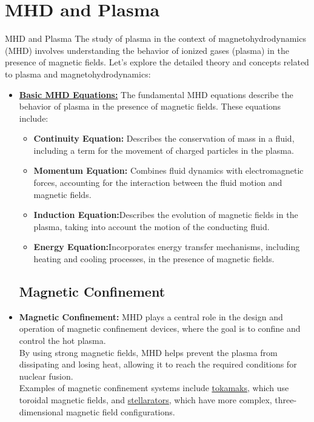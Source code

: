 \documentclass[13pt]{beamer}
\begin{document}
\section{MHD and Plasma}
\begin{frame}[t,allowframebreaks]{MHD and Plasma}
	The study of plasma in the context of magnetohydrodynamics (MHD) involves understanding the behavior of ionized gases (plasma) in the presence of magnetic fields. Let's explore the detailed theory and concepts related to plasma and magnetohydrodynamics: \\
	\vspace{0.5cm}
	\begin{itemize}
		\subsection{Basic MHD Equations}
		\item  \href{https://raw.githubusercontent.com/saurabhsg99/Plasma-ppt/main/Images/equations.jpg}{\textbf{Basic MHD Equations:}} The fundamental MHD equations describe the behavior of plasma in the presence of magnetic fields. These equations include:
		\begin{itemize}
			\vspace{0.2cm}
			\item \textbf{Continuity Equation:} Describes the conservation of mass in a fluid, including a term for the movement of charged particles in the plasma.

		\item	\textbf{Momentum Equation:} Combines fluid dynamics with electromagnetic forces, accounting for the interaction between the fluid motion and magnetic fields.

		\item	\textbf{	Induction Equation:}Describes the evolution of magnetic fields in the plasma, taking into account the motion of the conducting fluid.

		\item	\textbf{	Energy Equation:}Incorporates energy transfer mechanisms, including heating and cooling processes, in the presence of magnetic fields.

		\end{itemize}

		\subsection{Magnetic Confinement}
		\item	\textbf{Magnetic Confinement:} MHD plays a central role in the design and operation of magnetic confinement devices, where the goal is to confine and \framebreak control the hot plasma. \\
		By using strong magnetic fields, MHD helps prevent the
		 plasma from dissipating and losing heat, allowing it to reach the required conditions for nuclear fusion. \\
		Examples of magnetic confinement systems include
				\href{https://en.wikipedia.org/wiki/Tokamak}{\underline{tokamaks}}, which use toroidal magnetic fields, and \href{https://en.wikipedia.org/wiki/Stellarator}{\underline{stellarators}}, which have more complex, three-dimensional magnetic field configurations.



\end{itemize}
\end{frame}
\end{document}
